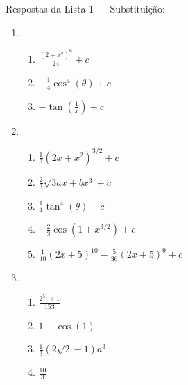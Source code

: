 \documentclass{article}
\newcommand{\ds}{\displaystyle}
\begin{document}
Respostas da Lista 1 --- Substitui\c{c}\~ao:
\begin{enumerate}
	\item
		\begin{enumerate}
			\item $\ds\frac{{(2+x^4)}^6}{24} + c$
			\item $\ds-\frac{1}{4}\cos^4(\theta) + c$
			\item $\ds-\tan\left(\frac{1}{x}\right) + c$ 
		\end{enumerate}
	\item
		\begin{enumerate}
			\item $\ds\frac{1}{3}{(2x+x^2)}^{3/2} + c$
			\item $\ds\frac{2}{3}\sqrt{3ax+bx^3} + c$
			\item $\ds\frac{1}{4} \tan^4(\theta) + c$
			\item $\ds-\frac{2}{3}\cos(1+x^{3/2}) + c$
			\item $\ds\frac{1}{40}{(2x+5)}^{10} -\frac{5}{36}{(2x+5)}^9 + c$
		\end{enumerate}
	\item
		\begin{enumerate}
			\item $\ds\frac{2^{51}+1}{153}$
			\item $1-\cos(1)$
			\item $\ds\frac{1}{3}(2\sqrt{2}-1)a^3$
			\item $\ds\frac{10}{3}$
		\end{enumerate}
\end{enumerate}
\end{document}
